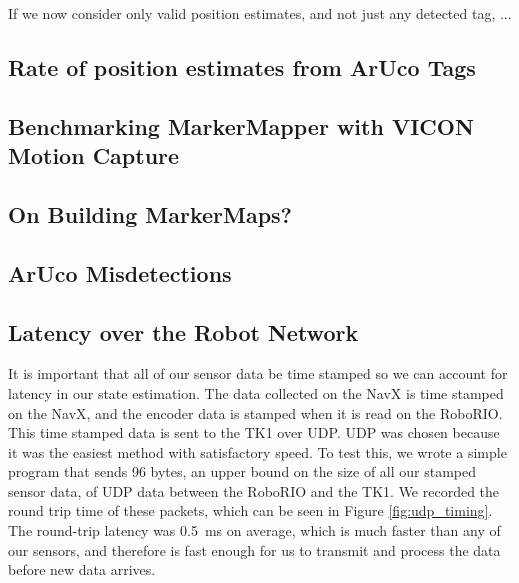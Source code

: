 \documentclass{article}
\begin{document}
    If we now consider only valid position estimates, and not just any detected tag, ... %


	\subsection{Rate of position estimates from ArUco Tags}

	\subsection{Benchmarking MarkerMapper with VICON Motion Capture}

	\subsection{On Building MarkerMaps?}

	\subsection{ArUco Misdetections}

	


	\subsection{Latency over the Robot Network}

		It is important that all of our sensor data be time stamped so we can account for latency in our state estimation. The data collected on the NavX is time stamped on the NavX, and the encoder data is stamped when it is read on the RoboRIO. This time stamped data is sent to the TK1 over UDP. UDP was chosen because it was the easiest method with satisfactory speed. To test this, we wrote a simple program that sends 96 bytes, an upper bound on the size of all our stamped sensor data, of UDP data between the RoboRIO and the TK1. We recorded the round trip time of these packets, which can be seen in Figure \ref{fig:udp_timing}. The round-trip latency was \SI{0.5}{\milli\second} on average, which is much faster than any of our sensors, and therefore is fast enough for us to transmit and process the data before new data arrives.
\end{document}
